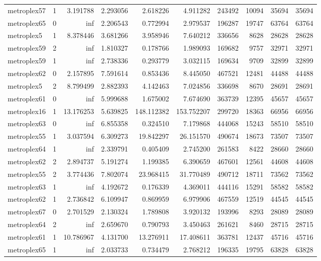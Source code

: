 \begin{longtable}{|l|r|r|r|r|r|r|r|r|r|}
metroplex57 & 1 & 3.191788 & 2.293056 & 2.618226 & 4.911282 & 243492 & 10094 & 35694 & 35694 \\
metroplex65 & 0 & inf & 2.206543 & 0.772994 & 2.979537 & 196287 & 19747 & 63764 & 63764 \\
metroplex5 & 1 & 8.378446 & 3.681266 & 3.958946 & 7.640212 & 336656 & 8628 & 28628 & 28628 \\
metroplex59 & 2 & inf & 1.810327 & 0.178766 & 1.989093 & 169682 & 9757 & 32971 & 32971 \\
metroplex59 & 1 & inf & 2.738336 & 0.293779 & 3.032115 & 169634 & 9709 & 32899 & 32899 \\
metroplex62 & 0 & 2.157895 & 7.591614 & 0.853436 & 8.445050 & 467521 & 12481 & 44488 & 44488 \\
metroplex5 & 2 & 8.799499 & 2.882393 & 4.142463 & 7.024856 & 336698 & 8670 & 28691 & 28691 \\
metroplex61 & 0 & inf & 5.999688 & 1.675002 & 7.674690 & 363739 & 12395 & 45657 & 45657 \\
metroplex16 & 1 & 13.176253 & 5.639825 & 148.112382 & 153.752207 & 299720 & 18363 & 66956 & 66956 \\
metroplex63 & 0 & inf & 6.855358 & 0.324510 & 7.179868 & 444068 & 15243 & 58510 & 58510 \\
metroplex55 & 1 & 3.037594 & 6.309273 & 19.842297 & 26.151570 & 490674 & 18673 & 73507 & 73507 \\
metroplex64 & 1 & inf & 2.339791 & 0.405409 & 2.745200 & 261583 & 8422 & 28660 & 28660 \\
metroplex62 & 2 & 2.894737 & 5.191274 & 1.199385 & 6.390659 & 467601 & 12561 & 44608 & 44608 \\
metroplex55 & 2 & 3.774436 & 7.802074 & 23.968415 & 31.770489 & 490712 & 18711 & 73562 & 73562 \\
metroplex63 & 1 & inf & 4.192672 & 0.176339 & 4.369011 & 444116 & 15291 & 58582 & 58582 \\
metroplex62 & 1 & 2.736842 & 6.109947 & 0.869959 & 6.979906 & 467559 & 12519 & 44545 & 44545 \\
metroplex67 & 0 & 2.701529 & 2.130324 & 1.789808 & 3.920132 & 193996 & 8293 & 28089 & 28089 \\
metroplex64 & 2 & inf & 2.659670 & 0.790793 & 3.450463 & 261621 & 8460 & 28715 & 28715 \\
metroplex61 & 1 & 10.786967 & 4.131700 & 13.276911 & 17.408611 & 363781 & 12437 & 45716 & 45716 \\
metroplex65 & 1 & inf & 2.033733 & 0.734479 & 2.768212 & 196335 & 19795 & 63828 & 63828 \\

\end{longtable}
